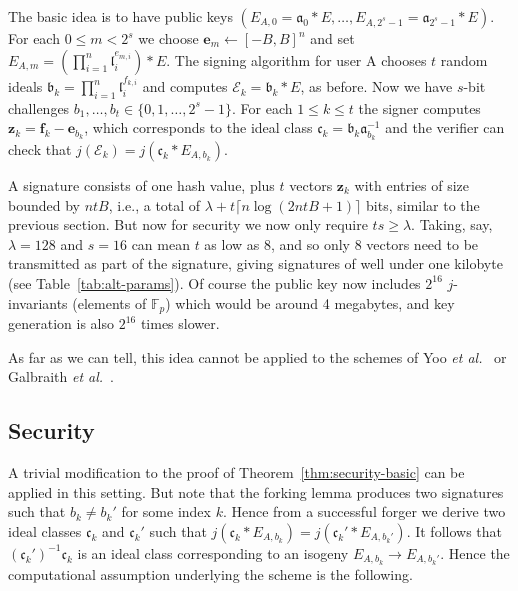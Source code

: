 \documentclass{llncs}
\newcommand{\E}{\mathcal{E}}
\newcommand{\F}{\mathbb{F}}
\renewcommand{\a}{\mathfrak{a}}
\renewcommand{\b}{\mathfrak{b}}
\renewcommand{\c}{\mathfrak{c}}
\renewcommand{\l}{\mathfrak{l}}
\newcommand{\e}{\mathbf{e}}
\newcommand{\f}{\mathbf{f}}
\newcommand{\z}{\mathbf{z}}
\begin{document}
The basic idea is to have public keys $( E_{A,0} = \a_0 * E , \dots , E_{A,2^s-1} = \a_{2^s-1} * E )$.
For each $0 \le m < 2^s$ we choose $\e_m \leftarrow [-B,B]^n$ and set $E_{A,m} = ( \prod_{i=1}^n \l_i^{e_{m,i}} ) * E$.
The signing algorithm for user A chooses $t$ random ideals $\b_k = \prod_{i=1}^n \l_i^{f_{k,i}}$ and computes $\E_k = \b_k * E$, as before.
Now we have $s$-bit challenges $b_1, \dots, b_t \in \{0, 1, \dots, 2^s-1 \}$.
For each $1 \le k \le t$ the signer computes $\z_k = \f_k - \e_{b_k}$, which corresponds to the ideal class $\c_k = \b_k \a_{b_k}^{-1} $ and the verifier can check that $j( \E_k ) = j( \c_k * E_{A, b_k})$.

A signature consists of one hash value, plus $t$ vectors $\z_k$ with entries of size bounded by $ntB$, i.e., a total of $\lambda + t\lceil n\log(2ntB + 1)\rceil$ bits, similar to the previous section.
But now for security we now only require $ts \ge \lambda$.
Taking, say, $\lambda = 128$ and $s = 16$ can mean $t$ as low as 8, and so only 8 vectors need to be transmitted as part of the signature, giving signatures of well under one kilobyte (see Table~\ref{tab:alt-params}).
Of course the public key now includes $2^{16}$ $j$-invariants (elements of $\F_p$) which would be around 4 megabytes, and key generation is also $2^{16}$ times slower.


As far as we can tell, this idea cannot be applied to the schemes of Yoo \emph{et al.}~\cite{YAJJS17} or Galbraith \emph{et al.}~\cite{GPS17}.





\subsection{Security}

A trivial modification to the proof of Theorem~\ref{thm:security-basic} can be applied in this setting. But note that the forking lemma produces two signatures such that $b_k \ne b_k'$ for some index $k$.
Hence from a successful forger we derive two ideal classes $\c_k$ and $\c_k'$ such that $j( \c_k * E_{A, b_k} ) = j( \c_k' * E_{A, b_k'})$. It follows that $(\c_k')^{-1} \c_k$ is an ideal class corresponding to an isogeny $E_{A,b_k} \to E_{A,b_k'}$.
Hence the computational assumption underlying the scheme is the following.
\end{document}
